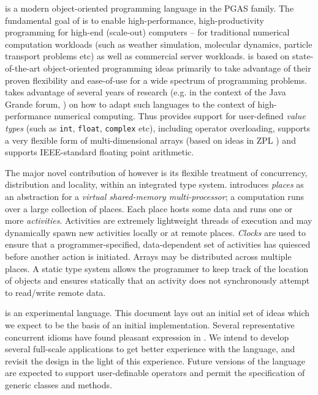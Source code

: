 \Xten{} is a modern object-oriented programming language
in the PGAS family. The fundamental goal of \Xten{} is to enable
high-performance, high-productivity programming for high-end
(scale-out) computers -- for traditional numerical computation
workloads (such as weather simulation, molecular dynamics, particle
transport problems etc) as well as commercial server
workloads. \Xten{} is based on state-of-the-art object-oriented
programming ideas primarily to take advantage of their proven
flexibility and ease-of-use for a wide spectrum of programming
problems. \Xten{} takes advantage of several years of research (e.g.{}
in the context of the Java Grande forum,
\cite{moreira00java,kava}) on how to adapt such languages to the context of
high-performance numerical computing. Thus \Xten{} provides support
for user-defined {\em value types} (such as {\tt int}, {\tt float},
{\tt complex} etc), including operator overloading, supports a very
flexible form of multi-dimensional arrays (based on ideas in ZPL
\cite{zpl}) and supports IEEE-standard floating point arithmetic.

The major novel contribution of \Xten{} however is its flexible
treatment of concurrency, distribution and locality, within an
integrated type system. \Xten{} introduces {\em places} as an
abstraction for a {\em virtual shared-memory multi-processor}; a
computation runs over a large collection of places. Each place hosts
some data and runs one or more {\em activities}. Activities are
extremely lightweight threads of execution and may dynamically spawn
new activities locally or at remote places. {\em Clocks} are used to
ensure that a programmer-specified, data-dependent set of activities
has quiesced before another action is initiated. Arrays may be
distributed across multiple places. A static type system allows the
programmer to keep track of the location of objects and ensures
statically that an activity does not synchronously attempt to
read/write remote data.


\Xten{} is an experimental language. This document lays out an initial set 
of ideas which we expect to be the basis of an initial
implementation. Several representative concurrent idioms have found
pleasant expression in \Xten. We intend to develop several full-scale
applications to get better experience with the language, and revisit
the design in the light of this experience. Future versions of the
language are expected to support user-definable operators and permit
the specification of generic classes and methods. 



